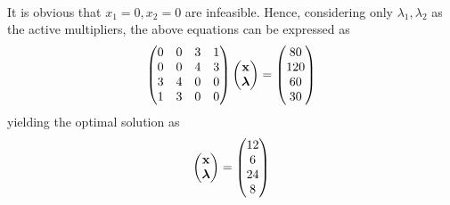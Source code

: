 \documentclass[journal,12pt,twocolumn]{IEEEtran}
\begin{document}
\begin{enumerate}
\begin{align}
              \end{align}
              It is obvious that $x_1=0, x_2=0$ are infeasible.  Hence, considering only $\lambda_1, \lambda_2$ as the active multipliers, the above equations can be expressed as
              \begin{align}
                  \begin{pmatrix}0 & 0 & 3 & 1
                      \\
                  0        & 0 & 4 & 3
                      \\
                  3        & 4 & 0 & 0
                      \\
                  1        & 3 & 0 & 0
                  \end{pmatrix}
                  \begin{pmatrix}\mathbf{x}       \\ \bm{\lambda}\end{pmatrix} = \begin{pmatrix}80\\120\\60\\30\end{pmatrix}
              \end{align}
              yielding the optimal solution as
              \begin{align}
                  \begin{pmatrix}\mathbf{x} \\ \bm{\lambda}\end{pmatrix} = \begin{pmatrix}12\\6\\24\\8\end{pmatrix}
              \end{align}
    \end{enumerate}
\end{document}
